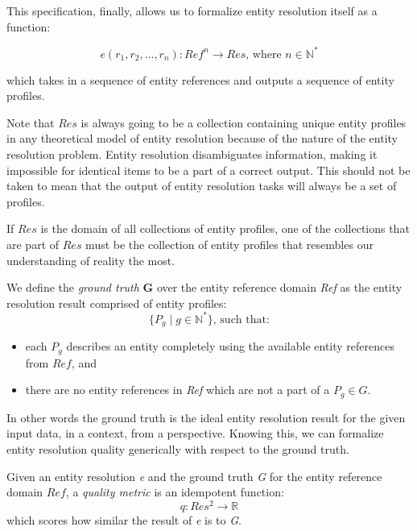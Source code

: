 This specification, finally, allows us to formalize entity resolution itself as a function:

\[
    e(r_1, r_2, \ldots, r_n): Ref^n \rightarrow Res\text{, where }n\in\mathbb{N^*}
\]

\noindent
which takes in a sequence of entity references and outputs a sequence of
entity profiles.

Note that $Res$ is always going to be a collection containing unique entity
profiles in any theoretical model of entity resolution because of the nature
of the entity resolution problem.
Entity resolution disambiguates information, making it impossible for
identical items to be a part of a correct output.
This should not be taken to mean that the output of entity resolution tasks
will always be a set of profiles.

If $Res$ is the domain of all collections of entity profiles, one of
the collections that are part of $Res$ must be the collection of entity
profiles that resembles our understanding of reality the most.

\begin{defn}
    We define the \textit{ground truth} \textbf{G} over the entity reference
    domain \textit{Ref} as the entity resolution result comprised of entity
    profiles:
    \[
        \{P_g \mid g \in \mathbb{N^*}\}\textrm{, such that:}
    \]
    \begin{itemize}
        \item each $P_g$ describes an entity completely using the available
        entity references from $Ref$, and
        \item there are no entity references in \textit{Ref} which are not a
        part of a $P_g \in G$.
    \end{itemize}
\end{defn}

In other words the ground truth is the ideal entity resolution result for 
the given input data, in a context, from a perspective.
Knowing this, we can formalize entity resolution quality generically with
respect to the ground truth.

\begin{defn}
Given an entity resolution \textit{e} and the ground truth \textit{G} for
the entity reference domain $Ref$, a \textit{quality metric} is an
idempotent function:
\[
    q: Res^2 \rightarrow \mathbb{R}
\]
which scores how similar the result of \textit{e} is to \textit{G}.
\end{defn}

